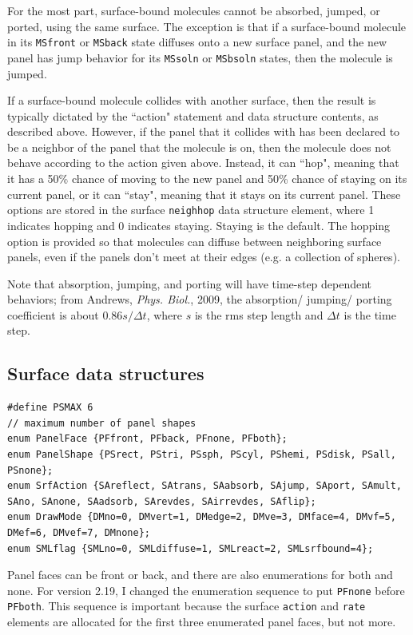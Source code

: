 \documentclass {scrbook}
\newcommand {\ttt} {\texttt}
\begin{document}
For the most part, surface-bound molecules cannot be absorbed, jumped, or ported, using the same surface. The exception is that if a surface-bound molecule in its \ttt{MSfront} or \ttt{MSback} state diffuses onto a new surface panel, and the new panel has jump behavior for its \ttt{MSsoln} or \ttt{MSbsoln} states, then the molecule is jumped.

If a surface-bound molecule collides with another surface, then the result is typically dictated by the ``action" statement and data structure contents, as described above. However, if the panel that it collides with has been declared to be a neighbor of the panel that the molecule is on, then the molecule does not behave according to the action given above. Instead, it can ``hop", meaning that it has a 50\% chance of moving to the new panel and 50\% chance of staying on its current panel, or it can ``stay", meaning that it stays on its current panel. These options are stored in the surface \ttt{neighhop} data structure element, where 1 indicates hopping and 0 indicates staying. Staying is the default. The hopping option is provided so that molecules can diffuse between neighboring surface panels, even if the panels don't meet at their edges (e.g. a collection of spheres).

Note that absorption, jumping, and porting will have time-step dependent behaviors; from Andrews, \emph{Phys. Biol.}, 2009, the absorption/ jumping/ porting coefficient is about $0.86s/\Delta t$, where $s$ is the rms step length and $\Delta t$ is the time step.


\subsection{Surface data structures}

\begin{lstlisting}
#define PSMAX 6															// maximum number of panel shapes
enum PanelFace {PFfront, PFback, PFnone, PFboth};
enum PanelShape {PSrect, PStri, PSsph, PScyl, PShemi, PSdisk, PSall, PSnone};
enum SrfAction {SAreflect, SAtrans, SAabsorb, SAjump, SAport, SAmult, SAno, SAnone, SAadsorb, SArevdes, SAirrevdes, SAflip};
enum DrawMode {DMno=0, DMvert=1, DMedge=2, DMve=3, DMface=4, DMvf=5, DMef=6, DMvef=7, DMnone};
enum SMLflag {SMLno=0, SMLdiffuse=1, SMLreact=2, SMLsrfbound=4};
\end{lstlisting}

Panel faces can be front or back, and there are also enumerations for both and none. For version 2.19, I changed the enumeration sequence to put \ttt{PFnone} before \ttt{PFboth}. This sequence is important because the surface \ttt{action} and \ttt{rate} elements are allocated for the first three enumerated panel faces, but not more.
\end{document}

